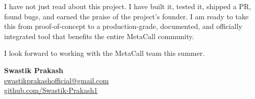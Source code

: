 \documentclass[12pt, a4paper]{article}
\begin{document}
I have not just read about this project. I have built it, tested it,
shipped a PR, found bugs, and earned the praise of the project's
founder. I am ready to take this from proof-of-concept to a
production-grade, documented, and officially integrated tool that
benefits the entire MetaCall community.

I look forward to working with the MetaCall team this summer.

\vspace{2em}
\noindent\textbf{Swastik Prakash}\\
\href{mailto:swastikprakashofficial@gmail.com}%
{swastikprakashofficial@gmail.com}\\
\href{https://github.com/Swastik-Prakash1}%
{github.com/Swastik-Prakash1}
\end{document}
